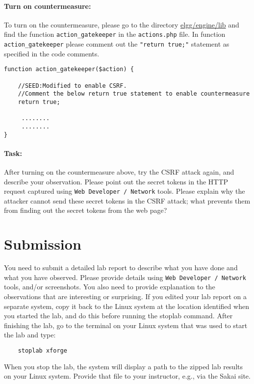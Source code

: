 \paragraph{Turn on countermeasure:}


To turn on the countermeasure, please go to the directory
\url{elgg/engine/lib} and 
find the function {\tt action\_gatekeeper} in the {\tt actions.php} file. 
In function {\tt action\_gatekeeper} please comment out the 
{\tt "return true;"} statement as specified in the code comments.

{\footnotesize
\begin{Verbatim}[frame=single]
function action_gatekeeper($action) {

	//SEED:Modified to enable CSRF. 
	//Comment the below return true statement to enable countermeasure
	return true;

	 ........
	 ........
}
\end{Verbatim}
}

\paragraph{Task:}
After turning on the countermeasure above, try the CSRF attack again, 
and describe your observation. Please point out the secret tokens in the 
HTTP request captured using {\tt Web Developer / Network} tools. Please explain why
the attacker cannot send these secret tokens in the CSRF attack; what
prevents them from finding out the secret tokens from the web page?   


\section{Submission}
You need to submit a detailed lab report to describe what you have
done and what you have observed. Please provide details using
{\tt Web Developer / Network} tools,  and/or screenshots.
You also need to provide explanation
to the observations that are interesting or surprising.
If you edited your lab report on a separate system, copy it back to the Linux system at the location 
identified when you started the lab, and do this before running the stoplab command.
After finishing the lab, go to the terminal on your Linux system that was used to start the lab and type:
\begin{verbatim}
    stoplab xforge
\end{verbatim}
When you stop the lab, the system will display a path to the zipped lab results on your Linux system.  Provide that file to
your instructor, e.g., via the Sakai site.


